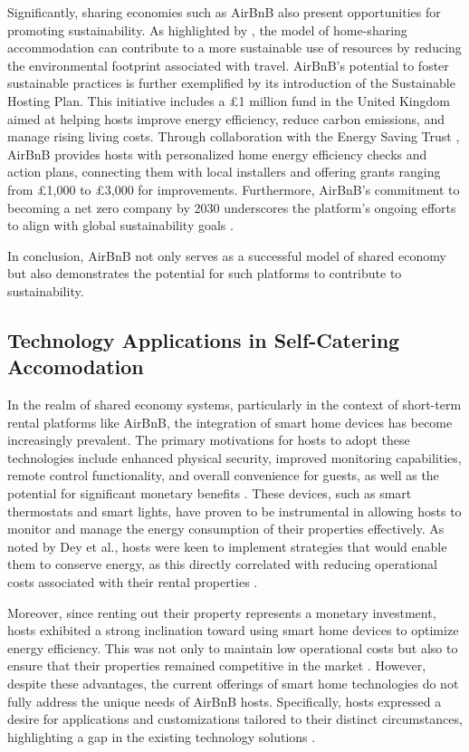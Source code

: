 Significantly, sharing economies such as AirBnB also present opportunities for promoting sustainability. As highlighted 
by \cite{Webb2014}, the model of home-sharing accommodation can contribute to a more sustainable use of resources by 
reducing the environmental footprint associated with travel. AirBnB's potential to foster sustainable practices is 
further exemplified by its introduction of the Sustainable Hosting Plan. This initiative includes a £1 million fund in 
the United Kingdom aimed at helping hosts improve energy efficiency, reduce carbon emissions, and manage rising living 
costs. Through collaboration with the Energy Saving Trust \cite{EST}, AirBnB provides hosts with personalized home 
energy efficiency checks and action plans, connecting them with local installers and offering grants ranging from £1,000 
to £3,000 for improvements. Furthermore, AirBnB's commitment to becoming a net zero company by 2030 underscores 
the platform's ongoing efforts to align with global sustainability goals \cite{Airbnb2022}.

In conclusion, AirBnB not only serves as a successful model of shared economy but also demonstrates the potential for 
such platforms to contribute to sustainability. 

\subsection{Technology Applications in Self-Catering Accomodation}

In the realm of shared economy systems, particularly in the context of short-term rental platforms like AirBnB, the 
integration of smart home devices has become increasingly prevalent. The primary motivations for hosts to adopt these 
technologies include enhanced physical security, improved monitoring capabilities, remote control functionality, and 
overall convenience for guests, as well as the potential for significant monetary benefits \cite{Dey2020}. These 
devices, such as smart thermostats and smart lights, have proven to be instrumental in allowing hosts to monitor and 
manage the energy consumption of their properties effectively. As noted by Dey et al., hosts were keen to implement 
strategies that would enable them to conserve energy, as this directly correlated with reducing operational costs 
associated with their rental properties \cite{Dey2020}.

Moreover, since renting out their property represents a monetary investment, hosts exhibited a strong inclination toward 
using smart home devices to optimize energy efficiency. This was not only to maintain low operational costs but also to 
ensure that their properties remained competitive in the market \cite{Dey2020}. However, despite these advantages, the 
current offerings of smart home technologies do not fully address the unique needs of AirBnB hosts. Specifically, hosts 
expressed a desire for applications and customizations tailored to their distinct circumstances, highlighting a gap in 
the existing technology solutions \cite{Dey2020}.

